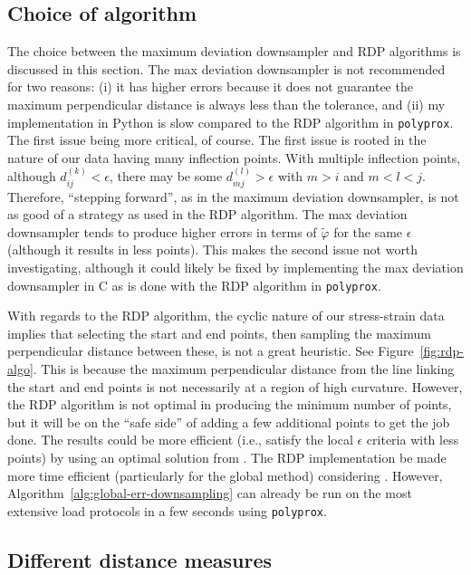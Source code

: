 \documentclass[a4paper,11pt]{article}
\begin{document}
\subsection{Choice of algorithm}

The choice between the maximum deviation downsampler and RDP algorithms is discussed in this section.
The max deviation downsampler is not recommended for two reasons:
(i) it has higher errors because it does not guarantee the maximum perpendicular distance is always less than the tolerance, and (ii) my implementation in Python is slow compared to the RDP algorithm in \texttt{polyprox}.
The first issue being more critical, of course.
The first issue is rooted in the nature of our data having many inflection points.
With multiple inflection points, although $d^{(k)}_{ij} < \epsilon$, there may be some $d^{(l)}_{mj} > \epsilon$ with $m > i$ and $m < l < j$.
Therefore, ``stepping forward'', as in the maximum deviation downsampler, is not as good of a strategy as used in the RDP algorithm.
The max deviation downsampler tends to produce higher errors in terms of $\tilde{\varphi}$ for the same $\epsilon$ (although it results in less points).
This makes the second issue not worth investigating, although it could likely be fixed by implementing the max deviation downsampler in C as is done with the RDP algorithm in \texttt{polyprox}.

With regards to the RDP algorithm, the cyclic nature of our stress-strain data implies that selecting the start and end points, then sampling the maximum perpendicular distance between these, is not a great heuristic.
See Figure~\ref{fig:rdp-algo}.
This is because the maximum perpendicular distance from the line linking the start and end points is not necessarily at a region of high curvature.
However, the RDP algorithm is not optimal in producing the minimum number of points, but it will be on the ``safe side'' of adding a few additional points to get the job done.
The results could be more efficient (i.e., satisfy the local $\epsilon$ criteria with less points) by using an optimal solution from \citet{ChanApproximationPolygonalCurves1996}.
The RDP implementation be made more time efficient (particularly for the global method) considering \citet{HershbergerSpeedingDouglasPeuckerLineSimpli1992}.
However, Algorithm~\ref{alg:global-err-downsampling} can already be run on the most extensive load protocols in a few seconds using \texttt{polyprox}.

\subsection{Different distance measures}
\end{document}
